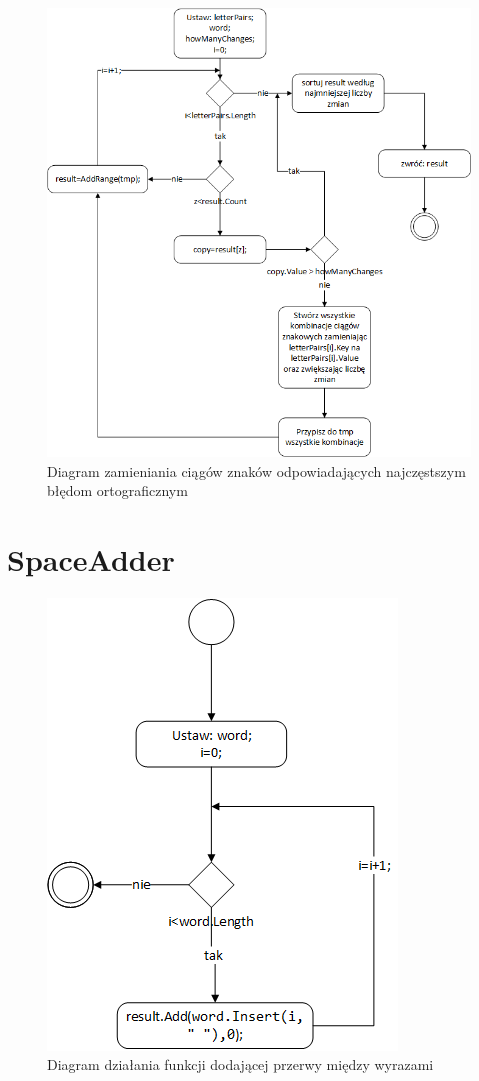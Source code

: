\begin{figure} [H]
	\centering
	\includegraphics[width=1\linewidth]{rozdzial02/LetterChanger.png}
	\caption{Diagram zamieniania ciągów znaków odpowiadających najczęstszym błędom ortograficznym}
	\label{fig:LetterChanger}
\end{figure}

\section{SpaceAdder}

\begin{figure} [H]
	\centering
	\includegraphics[width=0.6\linewidth]{rozdzial02/SpaceSearcher.png}
	\caption{Diagram działania funkcji dodającej przerwy między wyrazami}
	\label{fig:SpaceAdder}
\end{figure}



